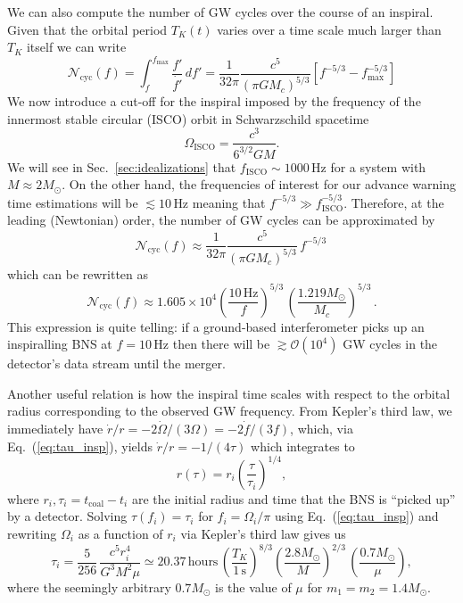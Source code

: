 \documentclass[prd,amsmath,amssymb,aps,floats,amsfonts,notitlepage,superscriptaddress,eqsecnum,nofootinbib,10pt]{revtex4-1}
\newcommand{\ord}{\mathcal{O}}
\newcommand{\f}{\frac}
\newcommand{\be}{\begin{equation}}
\newcommand{\ee}{\end{equation}}
\begin{document}
We can also compute the number of GW cycles over the course of an inspiral. Given that the orbital period $T_K(t)$ varies over a time scale much larger than $T_K$ itself
we can write
%
\be
\mathcal{N}_\text{cyc}(f) = \int_f^{f_\text{max}} \f{f'}{\dot{f'}}\, df' =\f{1}{32\pi} \f{c^5}{(\pi G M_c)^{5/3}}\left[ f^{-5/3}-f_\text{max}^{-5/3}\right] \label{eq:Ncyc1}
\ee
%
We now introduce a cut-off for the inspiral imposed by the frequency of the innermost stable circular (ISCO) orbit in Schwarzschild spacetime
\be
\Omega_\text{ISCO} = \f{c^3}{6^{3/2} G M} \label{eq:Sch_f_isco}.
\ee
%
%
We will see in Sec.~\ref{sec:idealizations} that $f_\text{ISCO} \sim 1000\,$Hz for a system with $M\approx 2 M_\odot$. 
On the other hand, the frequencies of interest for our advance warning time estimations will be $\lesssim 10\,$Hz
meaning that $f^{-5/3} \gg f_\text{ISCO}^{-5/3}$. Therefore, at the leading (Newtonian) order, the number of GW cycles can be approximated by
%
\be
\mathcal{N}_\text{cyc}(f) \approx \f{1}{32\pi} \f{c^5}{(\pi G M_c)^{5/3}}\, f^{-5/3} \,  \label{eq:Ncyc2}
\ee
%
%
which can be rewritten as
\be
\mathcal{N}_\text{cyc}(f)\approx 1.605\times 10^4 \left(\f{10\,\text{Hz}}{f} \right)^{5/3}\,\left(\f{1.219 M_\odot}{M_c}\right)^{5/3}\label{eq:Ncyc3}\, .
\ee
%
This expression is quite telling: if a ground-based interferometer picks up an
inspiralling BNS at $f=10\,$Hz then there will be $\gtrsim \ord(10^4)$ GW cycles in the detector's data stream until the merger.

Another useful relation is how the inspiral time scales with respect to the orbital radius corresponding to the observed GW frequency.
From Kepler's third law, we immediately have $\dot{r}/r= -2\dot{\Omega}/(3\Omega)=-2\dot{f}/(3f)$, which, via Eq.~(\ref{eq:tau_insp}),
yields $\dot{r}/r= -1/(4\tau)$ which integrates to
%
\be
r(\tau)=r_i \left(\f{\tau}{\tau_i}\right)^{1/4}\label{eq:r_of_tau},
\ee
%
where $r_i, \tau_i=t_\text{coal}-t_i$ are the initial radius and time that the BNS
is ``picked up'' by a detector. Solving $\tau(f_i)=\tau_i$ for $f_i=\Omega_i/\pi$ using Eq.~(\ref{eq:tau_insp}) and rewriting $\Omega_i$ as a function of $r_i$ via
Kepler's third law gives us
%
\be
\tau_i = \f{5}{256}\, \f{c^5 r_i^4}{G^3 M^2 \mu}\simeq 20.37\,\text{hours}\, \left(\f{T_K}{1\,\text{s}}\right)^{8/3} \left(\f{2.8M_\odot}{M}\right)^{2/3}\,\left(\f{0.7M_\odot}{\mu}\right) \label{eq:tau_of_r},
\ee
%
where the seemingly arbitrary $0.7M_\odot$ is the value of $\mu$ for $m_1=m_2=1.4M_\odot$.
\end{document}

